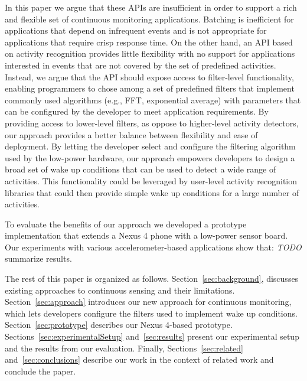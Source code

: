 In this paper we argue that these APIs are insufficient in order to
support a rich and flexible set of continuous monitoring applications.
Batching is inefficient for applications that depend on infrequent
events and is not appropriate for applications that require crisp
response time.  On the other hand, an API based on activity
recognition provides little flexibility with no support for
applications interested in events that are not covered by the set of
predefined activities.  Instead, we argue that the API should expose
access to filter-level functionality, enabling programmers to chose
among a set of predefined filters that implement commonly used
algorithms (e.g., FFT, exponential average) with parameters that can
be configured by the developer to meet application requirements.  By
providing access to lower-level filters, as oppose to higher-level
activity detectors, our approach provides a better balance between
flexibility and ease of deployment.  By letting the developer select
and configure the filtering algorithm used by the low-power hardware,
our approach empowers developers to design a broad set of wake up
conditions that can be used to detect a wide range of activities.
This functionality could be leveraged by user-level activity
recognition libraries that could then provide simple wake up
conditions for a large number of activities.

To evaluate the benefits of our approach we developed a prototype
implementation that extends a Nexus 4 phone with a low-power sensor
board.  Our experiments with various accelerometer-based applications
show that: {\em TODO} summarize results.

The rest of this paper is organized as follows.
Section~\ref{sec:background}, discusses existing approaches to
continuous sensing and their limitations.  Section~\ref{sec:approach}
introduces our new approach for continuous monitoring, which lets
developers configure the filters used to implement wake up conditions.
Section~\ref{sec:prototype} describes our Nexus 4-based prototype.
Sections~\ref{sec:experimentalSetup} and~\ref{sec:results} present our
experimental setup and the results from our evaluation.  Finally,
Sections~\ref{sec:related} and~\ref{sec:conclusions} describe our work
in the context of related work and conclude the paper.

